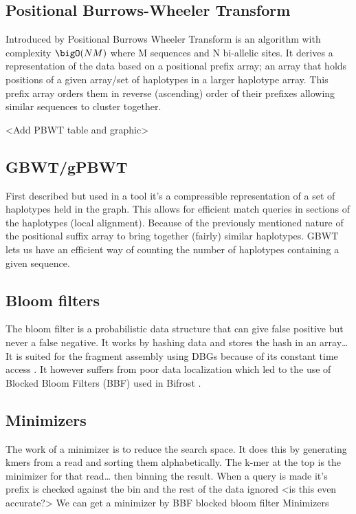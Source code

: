 \documentclass[11pt]{article}
\begin{document}
\subsection{Positional Burrows-Wheeler Transform}
\label{sec:org16924d8}
Introduced by \cite{durbinEfficientHaplotypeMatching2014} Positional Burrows 
Wheeler Transform is an algorithm with complexity \(\bigO(NM)\) where M sequences
and N bi-allelic sites.
It derives a representation of the data based on a positional prefix array; an
array that holds positions of a given array/set of haplotypes in a larger 
haplotype array. This prefix array orders them in reverse (ascending) order of
their prefixes allowing similar sequences to cluster together.

<Add PBWT table and graphic>

\subsection{GBWT/gPBWT}
\label{sec:orgf963c69}
First described \cite{novakGraphExtensionPositional2017} but used in a tool
\cite{sirenHaplotypeawareGraphIndexes2020} it’s a compressible representation of 
a set of haplotypes held in the graph. This allows for efficient match queries 
in sections of the haplotypes (local alignment). Because of the previously
mentioned nature of the positional suffix array to bring together (fairly) 
similar haplotypes.
GBWT lets us have an efficient way of counting the number of haplotypes 
containing a given sequence.

\subsection{Bloom filters}
\label{sec:org2954c9d}
The bloom filter is a probabilistic data structure that can give false positive
but never a false negative.  It works by hashing data and stores the hash in an
array\ldots{}
It is suited for the fragment assembly using DBGs because of its constant time
access \cite{chikhiSpaceefficientExactBruijn2013}. It however suffers from poor
data localization  which led to the use of Blocked Bloom Filters (BBF) 
\cite{putzeCacheHashSpaceefficient2010} used in
Bifrost \cite{holleyBifrostHighlyParallel2019}.

\subsection{Minimizers}
\label{sec:org585d3f8}
The work of a minimizer is to reduce the search space. It does this by generating
kmers from a read and sorting them alphabetically. The k-mer at the top is the
minimizer for that read\ldots{} then binning the result. When a query is made it’s
prefix is checked against the bin and the rest of the data ignored
<is this even accurate?>
We can get a minimizer by BBF blocked bloom filter Minimizers
\cite{grabowskiDiskbasedCompressionData2015,robertsReducingStorageRequirements2004}
\end{document}
